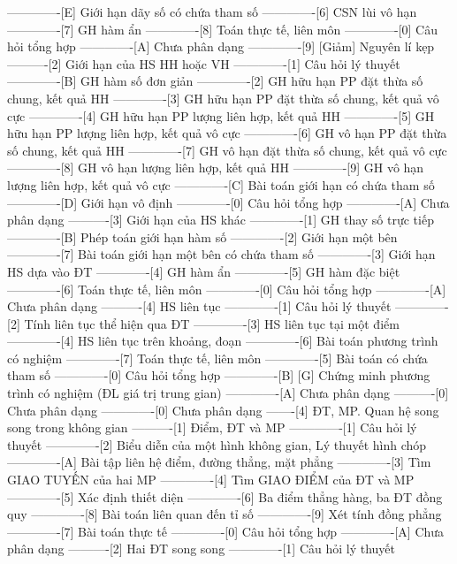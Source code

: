 -------------[E] Giới hạn dãy số có chứa tham số
-------------[6] CSN lùi vô hạn 
-------------[7] GH hàm ẩn
-------------[8] Toán thực tế, liên môn
-------------[0] Câu hỏi tổng hợp
-------------[A] Chưa phân dạng
-------------[9] [Giảm] Nguyên lí kẹp
----------[2] Giới hạn của HS HH hoặc VH
-------------[1] Câu hỏi lý thuyết
-------------[B] GH hàm số đơn giản
-------------[2] GH hữu hạn PP đặt thừa số chung, kết quả HH
-------------[3] GH hữu hạn PP đặt thừa số chung, kết quả vô cực
-------------[4] GH hữu hạn PP lượng liên hợp, kết quả HH
-------------[5] GH hữu hạn PP lượng liên hợp, kết quả vô cực
-------------[6] GH vô hạn PP đặt thừa số chung, kết quả HH
-------------[7] GH vô hạn đặt thừa số chung, kết quả vô cực
-------------[8] GH vô hạn lượng liên hợp, kết quả HH
-------------[9] GH vô hạn lượng liên hợp, kết quả vô cực
-------------[C] Bài toán giới hạn có chứa tham số
-------------[D] Giới hạn vô định
-------------[0] Câu hỏi tổng hợp
-------------[A] Chưa phân dạng
----------[3] Giới hạn của HS khác
-------------[1] GH thay số trực tiếp
-------------[B] Phép toán giới hạn hàm số
-------------[2] Giới hạn một bên
-------------[7] Bài toán giới hạn một bên có chứa tham số
-------------[3] Giới hạn HS dựa vào ĐT
-------------[4] GH hàm ẩn
-------------[5] GH hàm đặc biệt
-------------[6] Toán thực tế, liên môn
-------------[0] Câu hỏi tổng hợp
-------------[A] Chưa phân dạng
----------[4] HS liên tục
-------------[1] Câu hỏi lý thuyết
-------------[2] Tính liên tục thể hiện qua ĐT
-------------[3] HS liên tục tại một điểm
-------------[4] HS liên tục trên khoảng, đoạn
-------------[6] Bài toán phương trình có nghiệm
-------------[7] Toán thực tế, liên môn
-------------[5] Bài toán có chứa tham số
-------------[0] Câu hỏi tổng hợp
-------------[B] [G] Chứng minh phương trình có nghiệm (ĐL giá trị trung gian)
-------------[A] Chưa phân dạng
----------[0] Chưa phân dạng
-------------[0] Chưa phân dạng
-------[4] ĐT, MP. Quan hệ song song trong không gian
----------[1] Điểm, ĐT và MP
-------------[1] Câu hỏi lý thuyết
-------------[2] Biểu diễn của một hình không gian, Lý thuyết hình chóp
-------------[A] Bài tập liên hệ điểm, đường thẳng, mặt phẳng
-------------[3] Tìm GIAO TUYẾN của hai MP
-------------[4] Tìm GIAO ĐIỂM của ĐT và MP
-------------[5] Xác định thiết diện
-------------[6] Ba điểm thẳng hàng, ba ĐT đồng quy
-------------[8] Bài toán liên quan đến tỉ số
-------------[9] Xét tính đồng phẳng
-------------[7] Bài toán thực tế
-------------[0] Câu hỏi tổng hợp
-------------[A] Chưa phân dạng
----------[2] Hai ĐT song song
-------------[1] Câu hỏi lý thuyết
